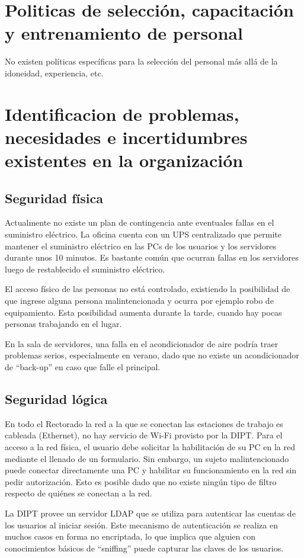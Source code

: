 \documentclass[a4paper,11pt,oneside]{article}
\begin{document}
\section{Politicas de selección, capacitación y entrenamiento de personal}

No existen políticas específicas para la selección del personal más
allá de la idoneidad, experiencia, etc.

\section{Identificacion de problemas, necesidades e incertidumbres existentes en la organización}
%
\subsection*{Seguridad física}
Actualmente no existe un plan de contingencia ante eventuales fallas
en el suministro eléctrico. La oficina cuenta con un UPS centralizado
que permite mantener el suministro eléctrico en las PCs de los
usuarios y los servidores durante unos 10 minutos. Es bastante común
que ocurran fallas en los servidores luego de restablecido el
suministro eléctrico.

El acceso físico de las personas no está controlado, existiendo la
posibilidad de que ingrese alguna persona malintencionada y ocurra por
ejemplo robo de equipamiento. Esta posibilidad aumenta durante la
tarde, cuando hay pocas personas trabajando en el lugar.

En la sala de servidores, una falla en el acondicionador de aire
podría traer problemas serios, especialmente en verano, dado que no
existe un acondicionador de ``back-up'' en caso que falle el
principal.
%
\subsection*{Seguridad lógica}
En todo el Rectorado la red a la que se conectan las estaciones de
trabajo es cableada (Ethernet), no hay servicio de Wi-Fi provisto por
la DIPT. Para el acceso a la red física, el usuario debe solicitar la
habilitación de su PC en la red mediante el llenado de un
formulario. Sin embargo, un sujeto malintencionado puede conectar
directamente una PC y habilitar su funcionamiento en la red sin pedir
autorización. Esto es posible dado que no existe ningún tipo de filtro
respecto de quiénes se conectan a la red.

La DIPT provee un servidor LDAP que se utiliza para autenticar las
cuentas de los usuarios al iniciar sesión. Este mecanismo de
autenticación se realiza en muchos casos en forma no encriptada, lo
que implica que alguien con conocimientos básicos de ``sniffing''
puede capturar las claves de los usuarios.
\end{document}
